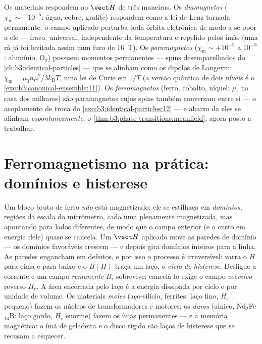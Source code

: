 \begin{remark}\label{rem:b3:electromagnetism-in-matter:zoo}
Os materiais respondem ao $\vect H$ de três maneiras.
Os \emph{diamagnetos} ($\chi_{\text{m}} \sim -10^{-5}$: água, cobre,
grafite) respondem como a lei de Lenz tornada permanente: o campo
aplicado perturba toda órbita eletrônica de modo a se opor a ele ---
fraco, universal, independente da temperatura e repelido pelos ímãs (uma
rã já foi levitada assim num furo de \qty{16}{T}).
Os \emph{paramagnetos} ($\chi_{\text{m}} \sim +10^{-5}$ a $10^{-3}$:
alumínio, O$_2$) possuem momentos permanentes --- spins desemparelhados
do \cref{ch:b3:identical-particles} --- que se alinham como os dipolos de
Langevin: $\chi_{\text{m}} = \mu_0 n\mu^2/3k_{\text{B}}T$, uma lei de
Curie em $1/T$ (a versão quântica de dois níveis é o
\cref{exo:b3:canonical-ensemble:11}).
Os \emph{ferromagnetos} (ferro, cobalto, níquel: $\mu_{\text{r}}$ na casa
dos milhares) são paramagnetos cujos spins também conversam entre si ---
o acoplamento de troca do \cref{exo:b3:identical-particles:12} ---
e abaixo da  eles se alinham \emph{espontaneamente}:
o \cref{thm:b3:phase-transitions:meanfield}, agora posto a trabalhar.
\end{remark}

\section{Ferromagnetismo na prática: domínios e histerese}

\begin{definition}\label{def:b3:electromagnetism-in-matter:hysteresis}
Um bloco bruto de ferro \emph{não} está magnetizado: ele se estilhaça em
\emph{domínios}, regiões da escala do micrômetro, cada uma plenamente
magnetizada, mas apontando para lados diferentes, de modo que o campo
exterior (e o custo em energia dele) quase se cancela. Um $\vect H$
aplicado move as paredes de domínio --- os domínios favoráveis crescem
--- e depois gira domínios inteiros para a linha. As paredes engancham
em defeitos, e por isso o processo é irreversível: varra o
$H$ para cima e para baixo e o $B(H)$ traça um laço, o \emph{ciclo de
histerese}. Desligue a corrente e um campo \emph{remanente}
$B_{\text{r}}$ sobrevive; cancelá-lo exige o campo \emph{coercivo}
reverso $H_{\text{c}}$. A área encerrada pelo laço é a
energia dissipada por ciclo e por unidade de volume. Os materiais
\emph{moles} (aço-silício, ferrites: laço fino, $H_{\text{c}}$ pequeno)
fazem os núcleos de transformadores e motores; os \emph{duros}
(alnico, Nd$_2$Fe$_{14}$B: laço gordo, $H_{\text{c}}$ enorme) fazem os
ímãs permanentes --- e a memória magnética: o ímã de geladeira
e o disco rígido são laços de histerese que se recusam a esquecer.
\end{definition}

